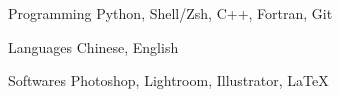 


\begin{cvskills}


\cvskill
{Programming} %
{Python, Shell/Zsh, C++, Fortran, Git} %



\cvskill
{Languages} %
{Chinese, English} %



\cvskill
{Softwares} %
{Photoshop, Lightroom, Illustrator, \LaTeX} %


\end{cvskills}
